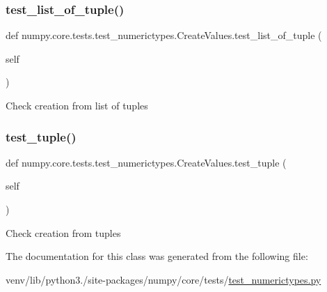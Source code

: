\subsubsection{\texorpdfstring{test\+\_\+list\+\_\+of\+\_\+tuple()}{test\_list\_of\_tuple()}}
{\footnotesize\ttfamily def numpy.\+core.\+tests.\+test\+\_\+numerictypes.\+Create\+Values.\+test\+\_\+list\+\_\+of\+\_\+tuple (\begin{DoxyParamCaption}\item[{}]{self }\end{DoxyParamCaption})}

\begin{DoxyVerb}Check creation from list of tuples\end{DoxyVerb}
 \mbox{\label{classnumpy_1_1core_1_1tests_1_1test__numerictypes_1_1CreateValues_aa4aa2c07bedf3003bc47580b70782fa5}} 
\subsubsection{\texorpdfstring{test\+\_\+tuple()}{test\_tuple()}}
{\footnotesize\ttfamily def numpy.\+core.\+tests.\+test\+\_\+numerictypes.\+Create\+Values.\+test\+\_\+tuple (\begin{DoxyParamCaption}\item[{}]{self }\end{DoxyParamCaption})}

\begin{DoxyVerb}Check creation from tuples\end{DoxyVerb}
 

The documentation for this class was generated from the following file\+:\begin{DoxyCompactItemize}
\item 
venv/lib/python3./site-\/packages/numpy/core/tests/\hyperlink{test__numerictypes_8py}{test\+\_\+numerictypes.\+py}\end{DoxyCompactItemize}
